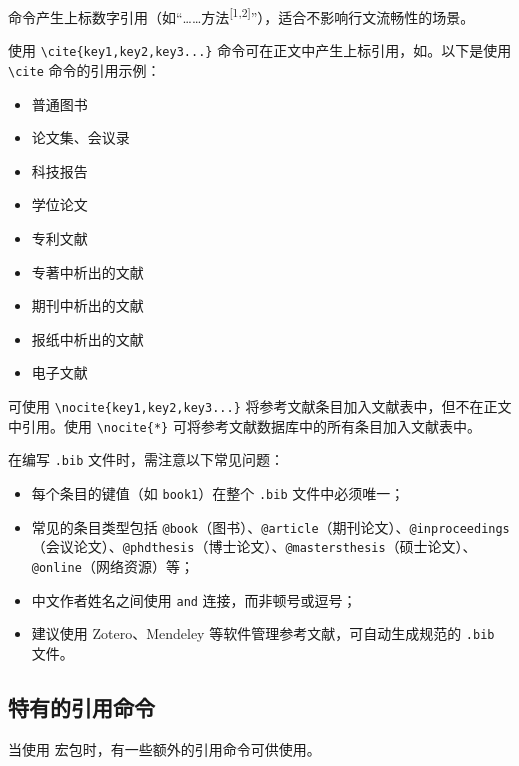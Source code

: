  命令产生上标数字引用（如“……方法\textsuperscript{[1,2]}”），适合不影响行文流畅性的场景。

使用 \verb|\cite{key1,key2,key3...}| 命令可在正文中产生上标引用，如\cite{book1,online1,article1}。以下是使用 \verb|\cite| 命令的引用示例：
\begin{itemize}
  \item 普通图书\cite{book1,book2}
  \item 论文集、会议录\cite{conf1,conf2}
  \item 科技报告\cite{techreport1,techreport2}
  \item 学位论文\cite{thesis1,thesis2,thesis3}
  \item 专利文献\cite{patent1,patent2}
  \item 专著中析出的文献\cite{inbook1,inbook2}
  \item 期刊中析出的文献\cite{qin2021,article1,guo_deepseek-r1_2025}
  \item 报纸中析出的文献\cite{newspaper1,newspaper2}
  \item 电子文献\cite{online1,online2,online3}
\end{itemize}

可使用 \verb|\nocite{key1,key2,key3...}| 将参考文献条目加入文献表中，但不在正文中引用。使用 \verb|\nocite{*}| 可将参考文献数据库中的所有条目加入文献表中。

在编写 \texttt{.bib} 文件时，需注意以下常见问题：
\begin{itemize}
  \item 每个条目的键值（如 \texttt{book1}）在整个 \texttt{.bib} 文件中必须唯一；
  \item 常见的条目类型包括 \texttt{@book}（图书）、\texttt{@article}（期刊论文）、\texttt{@inproceedings}（会议论文）、\texttt{@phdthesis}（博士论文）、\texttt{@mastersthesis}（硕士论文）、\texttt{@online}（网络资源）等；
  \item 中文作者姓名之间使用 \texttt{and} 连接，而非顿号或逗号；
  \item 建议使用 Zotero、Mendeley 等软件管理参考文献，可自动生成规范的 \texttt{.bib} 文件。
\end{itemize}

\ifx\fullcite\undefined\else
\subsection{\BibLaTeX{}特有的引用命令}

当使用  宏包时，有一些额外的引用命令可供使用。

